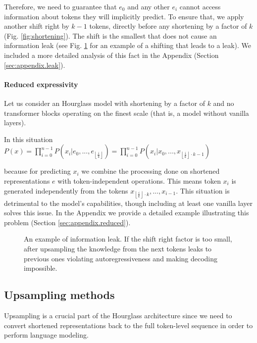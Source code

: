 \documentclass[11pt]{article}
\newcommand{\floor}[1]{\left\lfloor #1 \right\rfloor}
\begin{document}
Therefore, we need to guarantee that $e_0$ and any other $e_i$ cannot access information about tokens they will implicitly predict. To ensure that, we apply another shift right by $k - 1$ tokens, directly before any shortening by a factor of $k$ (Fig. \ref{fig:shortening}). The shift is the smallest that does not cause an information leak (see Fig. \ref{fig:leak} for an example of a shifting that leads to a leak). We included a more detailed analysis of this fact in the Appendix (Section \ref{sec:appendix.leak}).


\paragraph{Reduced expressivity}
Let us consider an Hourglass model with shortening by a factor of $k$ and no transformer blocks operating on the finest scale (that is, a model without vanilla layers). 

In this situation\\ 
$P(x) = \prod_{i=0}^{n-1}P(x_i | e_0,...,e_{\floor{\frac{i}{k}}}) = \prod_{i=0}^{n-1}P(x_i | x_0,...,x_{\floor{\frac{i}{k}} \cdot k - 1})$

because for predicting $x_i$ we combine the processing done on shortened representations $e$ with token-independent operations. This  means token $x_i$ is generated independently from the tokens $x_{\floor{\frac{i}{k}} \cdot k}, ..., x_{i-1}$. This situation is detrimental to the model's capabilities, though including at least one vanilla layer solves this issue. In the Appendix we provide a detailed example illustrating this problem (Section \ref{sec:appendix.reduced}). 

\begin{figure}[ht]
\centering
\centering
\caption{An example of information leak. If the shift right factor is too small, after upsampling the knowledge from the next tokens leaks to previous ones violating autoregressiveness and making decoding impossible. }
\label{fig:leak}
\end{figure}

\subsection{Upsampling methods}\label{sec:upsampling-methods}
Upsampling is a crucial part of the Hourglass architecture since we need to convert shortened representations back to the full token-level sequence in order to perform language modeling. 
\end{document}
